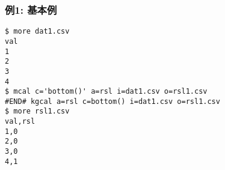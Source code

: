 \subsubsection*{例1: 基本例}



\begin{Verbatim}[baselinestretch=0.7,frame=single]
$ more dat1.csv
val
1
2
3
4
$ mcal c='bottom()' a=rsl i=dat1.csv o=rsl1.csv
#END# kgcal a=rsl c=bottom() i=dat1.csv o=rsl1.csv
$ more rsl1.csv
val,rsl
1,0
2,0
3,0
4,1
\end{Verbatim}

